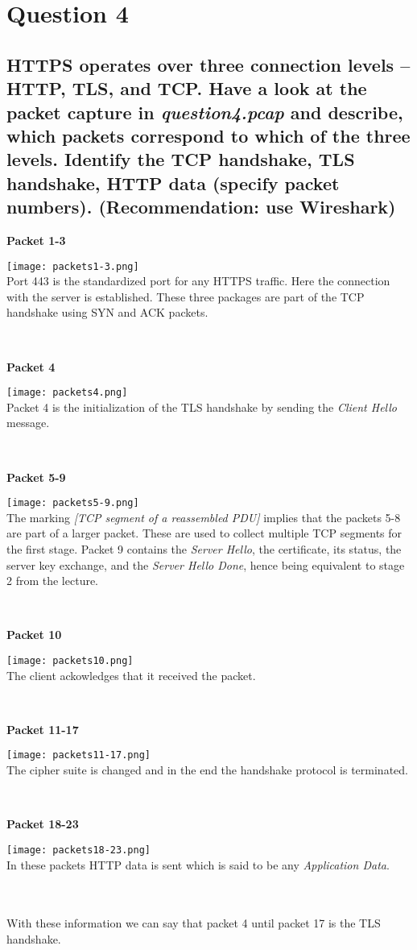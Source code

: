 \documentclass{report}
\begin{document}
	\section{Question 4}
	\startsection
		\renewcommand{\thesubsection}{\thesection.\Alph{subsection}}
		\subsection{HTTPS operates over three connection levels – HTTP, TLS, and TCP. Have a look at the packet capture in \textit{question4.pcap} and describe, which packets correspond to which of the three levels. Identify the TCP handshake, TLS handshake, HTTP data (specify packet numbers). (Recommendation: use Wireshark)}
		\startsubsection
			\parbox{2.5cm}{\textbf{Packet 1-3}\dotfill} \parbox[t]{12cm}{\texttt{[image: packets1-3.png]} \\ Port 443 is the standardized port for any HTTPS traffic. Here the connection with the server is established. These three packages are part of the TCP handshake using SYN and ACK packets.} \\
			\parbox{2.5cm}{\textbf{Packet 4}\dotfill} \parbox[t]{12cm}{\texttt{[image: packets4.png]} \\ Packet 4 is the initialization of the TLS handshake by sending the \textit{Client Hello} message.} \\
			\parbox{2.5cm}{\textbf{Packet 5-9}\dotfill} \parbox[t]{12cm}{\texttt{[image: packets5-9.png]} \\ The marking \textit{[TCP segment of a reassembled PDU]} implies that the packets 5-8 are part of a larger packet. These are used to collect multiple TCP segments for the first stage. Packet 9 contains the \textit{Server Hello}, the certificate, its status, the server key exchange, and the \textit{Server Hello Done}, hence being equivalent to stage 2 from the lecture.} \\
			\parbox{2.5cm}{\textbf{Packet 10}\dotfill} \parbox[t]{12cm}{\texttt{[image: packets10.png]} \\ The client ackowledges that it received the packet.} \\
			\parbox{2.5cm}{\textbf{Packet 11-17}\dotfill} \parbox[t]{12cm}{\texttt{[image: packets11-17.png]} \\ The cipher suite is changed and in the end the handshake protocol is terminated.} \\
			\parbox{2.5cm}{\textbf{Packet 18-23}\dotfill} \parbox[t]{12cm}{\texttt{[image: packets18-23.png]} \\ In these packets HTTP data is sent which is said to be any \textit{Application Data}.} \\ \\
			With these information we can say that packet 4 until packet 17 is the TLS handshake.
		\closesection
\end{document}
